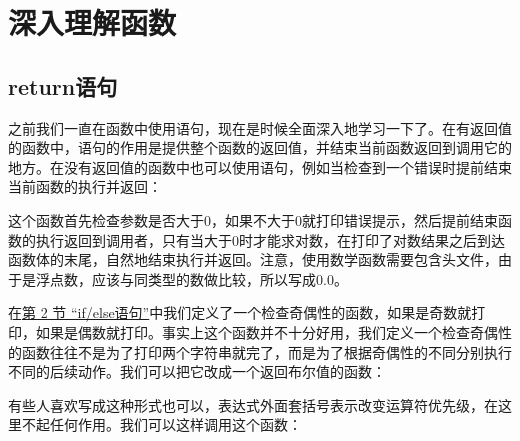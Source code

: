 

\chapter{深入理解函数}
%





\section{return语句}
%
之前我们一直在函数中使用语句，现在是时候全面深入地学习一下了。在有返回值的函数中，语句的作用是提供整个函数的返回值，并结束当前函数返回到调用它的地方。在没有返回值的函数中也可以使用语句，例如当检查到一个错误时提前结束当前函数的执行并返回：




这个函数首先检查参数是否大于0，如果不大于0就打印错误提示，然后提前结束函数的执行返回到调用者，只有当大于0时才能求对数，在打印了对数结果之后到达函数体的末尾，自然地结束执行并返回。注意，使用数学函数需要包含头文件，由于是浮点数，应该与同类型的数做比较，所以写成0.\BookSplit{}0。



在\hyperlink{db.ch04s02.id2718511}{第 2 节 “if/\BookSplit{}else语句”}中我们定义了一个检查奇偶性的函数，如果是奇数就打印，如果是偶数就打印。事实上这个函数并不十分好用，我们定义一个检查奇偶性的函数往往不是为了打印两个字符串就完了，而是为了根据奇偶性的不同分别执行不同的后续动作。我们可以把它改成一个返回布尔值的函数：




有些人喜欢写成这种形式也可以，表达式外面套括号表示改变运算符优先级，在这里不起任何作用。我们可以这样调用这个函数：




